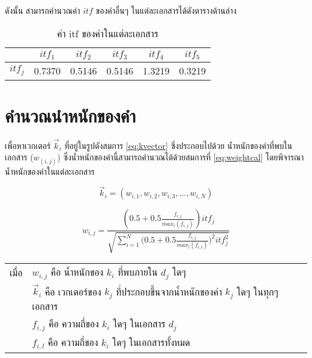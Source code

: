 \documentclass[11pt,a4paper]{article}
\begin{document}
{    ดังนั้น สามารถคำนวณค่า $itf$ ของคำอื่นๆ ในแต่ละเอกสารได้ดังตารางด้านล่าง
    \begin{table}[ht!]
        \centering
        \caption{ค่า itf ของคำในแต่ละเอกสาร}
        \label{tab:itf}
        \begin{tabular}{l|ccccc}
                    & $itf_1$   & $itf_2$   & $itf_3$   & $itf_4$   & $itf_5$ \\
                    \hline
            $itf_j$ & 0.7370    & 0.5146    & 0.5146    & 1.3219    & 0.3219 \\
        \end{tabular}
    \end{table}

    \clearpage
    \section{คำนวณนำหนักของคำ}
    เพื่อหาเวกเตอร์ $\overrightarrow{k}_i$ ที่อยู่ในรูปดังสมการ \ref{eq:kvector} ซึ่งประกอบไปด้วย น้ำหนักของคำที่พบในเอกสาร ($w_(i,j)$) ซึ่งน้ำหนักของคำนี้สามารถคำนวณได้ด้วยสมการที่ \ref{eq:weightcal} โดยพิจารณาน้ำหนักของคำในแต่ละเอกสาร

    \begin{equation}
        \label{eq:kvector}
        \overrightarrow{k}_i = (w_{i,1}, w_{i,2}, w_{i,3}, ..., w_{i,N})
    \end{equation}

    \begin{equation}
        \label{eq:weightcal}
        w_{i,j} = \frac{(0.5 + 0.5\frac{f_{i,j}}{max_i(f_{i,j})}) itf_{j}}
                       {\sqrt{\sum_{i=1}^{N}({0.5 + 0.5\frac{f_{i,j}}{max_l(f_{i,l})})^2 itf_j^2}}}
    \end{equation}

    \begin{table}[ht!]
        \begin{tabular}{p{1cm}l}
            เมื่อ & $w_{i,j}$ คือ น้ำหนักของ $k_i$ ที่พบภายใน $d_j$ ใดๆ \\
                & $\overrightarrow{k}_i$ คือ เวกเตอร์ของ $k_j$ ที่ประกอบขึ้นจากน้ำหนักของคำ $k_j$ ใดๆ ในทุกๆ เอกสาร \\
                & $f_{i,j}$ คือ ความถี่ของ $k_i$ ใดๆ ในเอกสาร $d_j$ \\
                & $f_{i,l}$ คือ ความถี่ของ $k_i$ ใดๆ ในเอกสารทั้งหมด \\
        \end{tabular}
    \end{table}

}
\end{document}
